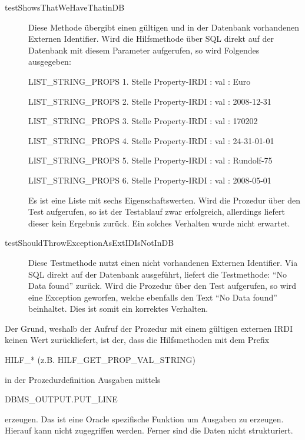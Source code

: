 \begin{description}
\item[ testShowsThatWeHaveThatinDB] Diese Methode übergibt einen gültigen und in der Datenbank vorhandenen Externen Identifier. Wird die Hilfsmethode über SQL direkt auf der Datenbank mit diesem Parameter aufgerufen, so wird Folgendes ausgegeben:

  LIST\_STRING\_PROPS 1. Stelle
  Property-IRDI :  val : Euro
  
  LIST\_STRING\_PROPS 2. Stelle
  Property-IRDI :  val : 2008-12-31
  
  LIST\_STRING\_PROPS 3. Stelle
  Property-IRDI :  val : 170202
  
  LIST\_STRING\_PROPS 4. Stelle
  Property-IRDI :  val : 24-31-01-01
  
  LIST\_STRING\_PROPS 5. Stelle
  Property-IRDI :  val : Rundolf-75
  
  LIST\_STRING\_PROPS 6. Stelle
  Property-IRDI :  val : 2008-05-01
  
Es ist eine Liste mit sechs Eigenschaftswerten.
Wird die Prozedur über den Test aufgerufen, so ist der Testablauf zwar erfolgreich, allerdings liefert dieser kein Ergebnis zurück. Ein solches Verhalten wurde nicht erwartet. 
  
\item[ testShouldThrowExceptionAsExtIDIsNotInDB] Diese Testmethode nutzt einen nicht vorhandenen Externen Identifier. Via SQL direkt auf der Datenbank ausgeführt, liefert die Testmethode: \enquote{No Data found} zurück. 
Wird die Prozedur über den Test aufgerufen, so wird eine Exception geworfen, welche ebenfalls den Text  \enquote{No Data found} beinhaltet. Dies ist somit ein korrektes Verhalten. 
\end{description}

Der Grund, weshalb der Aufruf der Prozedur mit einem gültigen externen \gls{IRDI} keinen Wert zurückliefert, ist der, dass die Hilfsmethoden mit dem Prefix 

HILF\_* (z.B. HILF\_GET\_PROP\_VAL\_STRING) 

in der Prozedurdefinition Ausgaben mittels 

DBMS\_OUTPUT.PUT\_LINE 

erzeugen. Das ist eine Oracle spezifische Funktion um Ausgaben zu erzeugen. Hierauf kann nicht zugegriffen werden. Ferner sind die Daten nicht strukturiert.   

